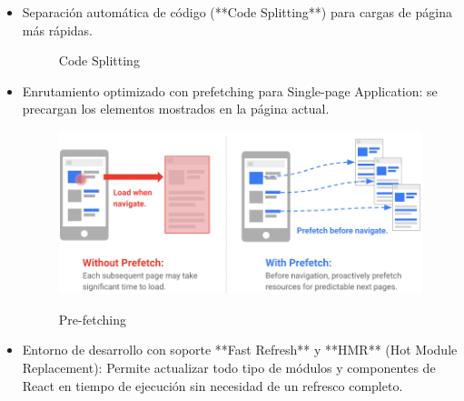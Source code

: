 \documentclass[12pt,twoside,titlepage]{report}
\begin{document}
\begin{itemize}
    \item Separación automática de código (**Code Splitting**) para cargas de página más rápidas.
        \begin{figure}[H]
            \centering
            \caption{Code Splitting}
            \label{f:codesplit}
        \end{figure}
    \item Enrutamiento optimizado con prefetching para Single-page Application: se precargan los elementos mostrados en la página actual.
        \begin{figure}[H]
            \centering
            \includegraphics[scale=0.45]{nextjs_prefetch}
            \label{fig:nextjs_prefetch}
            \caption{Pre-fetching}
        \end{figure}
    \item Entorno de desarrollo con soporte **Fast Refresh** y **HMR** (Hot Module Replacement): Permite actualizar todo tipo de módulos y componentes de React en tiempo de ejecución sin necesidad de un refresco completo.

\end{itemize}
\end{document}
